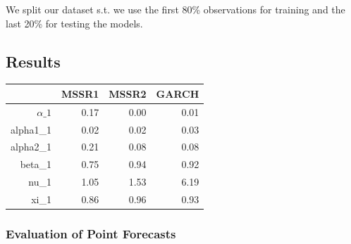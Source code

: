 \documentclass[11pt,a4paper]{article}
\begin{document}
We split our dataset s.t. we use the first 80\% observations for training and the last 20\% for testing the models.


\subsection{Results}

\begin{table}[ht]
\centering
\begin{tabular}{rrrr}
  \hline
 & MSSR1 & MSSR2 & GARCH \\ 
  \hline
$\alpha\_1$ & 0.17 & 0.00 & 0.01 \\ 
  alpha1\_1 & 0.02 & 0.02 & 0.03 \\ 
  alpha2\_1 & 0.21 & 0.08 & 0.08 \\ 
  beta\_1 & 0.75 & 0.94 & 0.92 \\ 
  nu\_1 & 1.05 & 1.53 & 6.19 \\ 
  xi\_1 & 0.86 & 0.96 & 0.93 \\ 
   \hline
\end{tabular}
\end{table}


\subsubsection{Evaluation of Point Forecasts}
\end{document}
